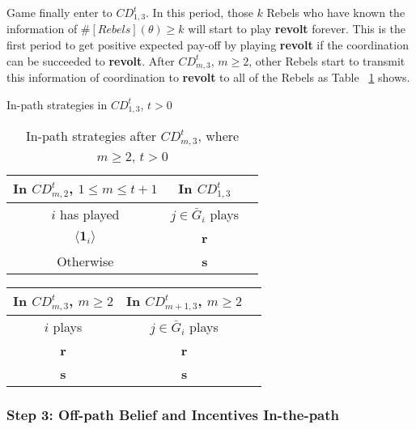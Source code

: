 \documentclass[12pt,letter]{article}
\theoremstyle{definition}
\theoremstyle{remark}
\theoremstyle{claim}
\begin{document}
Game finally enter to $CD^t_{1,3}$. In this period, those $k$ Rebels who have known the information of $\#[Rebels](\theta)\geq k$ will start to play \textbf{revolt} forever. This is the first period to get positive expected pay-off by playing \textbf{revolt} if the coordination can be succeeded to \textbf{revolt}. After $CD^t_{m,3}$, $m\geq 2$, other Rebels start to transmit this information of coordination to \textbf{revolt} to all of the Rebels as Table ~\ref{Table_stg_cdm3} shows.

\begin{table}[t]
\caption{In-path strategies in $CD^t_{1,3}$, $t>0$}
\label{Table_stg_cd13}
\begin{center}
\begin{tabular}{c c c}
In $CD^t_{m,2}$, $1\leq m\leq t+1$ 	 	&  	In $CD^t_{1,3}$		& 	\\
\hline
\hline
$i$ has played 		  							&  $j\in \bar{G}_{i}$ plays  								& \\
\hline
$\langle \mathbf{1}_i \rangle$ 	& 	\textbf{r}	    &  \\
Otherwise		&  \textbf{s}	&  \\

\end{tabular}
\caption{In-path strategies after $CD^t_{m,3}$, where $m\geq 2$, $t>0$}
\label{Table_stg_cdm3}
\end{center}
\end{table}

\begin{table}[t]
\begin{center}
\begin{tabular}{c c c}
In $CD^t_{m,3}$, $m\geq 2$ 	 	&  	In $CD^t_{m+1,3}$, $m\geq 2$		& 	\\
\hline
\hline
$i$ plays 		  							&  $j\in \bar{G}_{i}$ plays  								& \\
\hline
\textbf{r} 	& 	\textbf{r}	    &  \\
\textbf{s}		&  \textbf{s}	&  \\

\end{tabular}
\end{center}
\end{table}



\subsubsection{Step 3: Off-path Belief and Incentives In-the-path}
\end{document}
